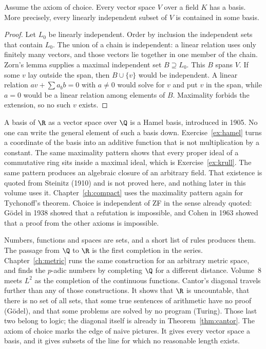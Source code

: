 \begin{theorem}\label{thm:basis}
Assume the axiom of choice. Every vector space $V$ over a field $K$ has a basis. More precisely, every linearly independent subset of $V$ is contained in some basis.
\end{theorem}
\begin{proof}
Let $L_0$ be linearly independent. Order by inclusion the independent sets that contain $L_0$. The union of a chain is independent: a linear relation uses only finitely many vectors, and those vectors lie together in one member of the chain. Zorn's lemma supplies a maximal independent set $B\supseteq L_0$. This $B$ spans $V$. If some $v$ lay outside the span, then $B\cup\{v\}$ would be independent. A linear relation $a v+\sum a_b b=0$ with $a\ne 0$ would solve for $v$ and put $v$ in the span, while $a=0$ would be a linear relation among elements of $B$.
Maximality forbids the extension, so no such $v$ exists.
\end{proof}

A basis of $\R$ as a vector space over $\Q$ is a Hamel basis, introduced in 1905. No one can write the general element of such a basis down. Exercise~\ref{ex:hamel} turns a coordinate of the basis into an additive function that is not multiplication by a constant. The same maximality pattern shows that every proper ideal of a commutative ring sits inside a maximal ideal, which is Exercise~\ref{ex:krull}. The same pattern produces an algebraic closure of an arbitrary field. That existence is quoted from Steinitz (1910) and is not proved here, and nothing later in this volume uses it. Chapter~\ref{ch:compact} uses the maximality pattern again for Tychonoff's theorem. Choice is independent of ZF in the sense already quoted: G\"odel in 1938 showed that a refutation is impossible, and Cohen in 1963 showed that a proof from the other axioms is impossible.

\begin{beauty}
Numbers, functions and spaces are sets, and a short list of rules produces them. The passage from $\Q$ to $\R$ is the first completion in the series. Chapter~\ref{ch:metric} runs the same construction for an arbitrary metric space, and finds the $p$-adic numbers by completing $\Q$ for a different distance. Volume~8 meets $L^2$ as the completion of the continuous functions. Cantor's diagonal travels further than any of those constructions. It shows that $\R$ is uncountable, that there is no set of all sets, that some true sentences of arithmetic have no proof (G\"odel), and that some problems are solved by no program (Turing). Those last two belong to logic; the diagonal itself is already in Theorem~\ref{thm:cantor}. The axiom of choice marks the edge of naive pictures. It gives every vector space a basis, and it gives subsets of the line for which no reasonable length exists.
\end{beauty}


